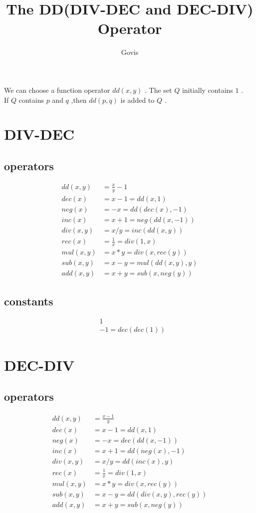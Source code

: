 \documentclass{article}
\title{The DD(DIV-DEC and DEC-DIV) Operator}
\author{Govis}
\begin{document}
\maketitle

\begin{center}
We can choose a function operator $ dd(x, y) $ . The set $ Q $ initially contains $ 1 $ . \\
If $ Q $ contains $ p $ and $ q $ ,then $ dd(p,q) $ is added to $ Q $ .
\end{center}

\section*{DIV-DEC}

\subsection*{operators}
\begin{align*}
dd(x, y) &= \frac{x}{y} - 1 \\
dec(x) &= x - 1 = dd(x, 1) \\
neg(x) &= -x = dd(dec(x), -1) \\
inc(x) &= x + 1 = neg(dd(x, -1)) \\
div(x, y) &= x / y = inc(dd(x, y)) \\
rec(x) &= \frac{1}{x} = div(1, x) \\
mul(x, y) &= x * y = div(x, rec(y)) \\
sub(x, y) &= x - y = mul(dd(x, y), y) \\
add(x, y) &= x + y = sub(x, neg(y))
\end{align*}


\subsection*{constants}
\begin{align*}
&1 \\
&-1 = dec(dec(1))
\end{align*}

\section*{DEC-DIV}

\subsection*{operators}
\begin{align*}
dd(x, y) &= \frac{x - 1}{y} \\
dec(x) &= x - 1 = dd(x, 1) \\
neg(x) &= -x = dec(dd(x, -1)) \\
inc(x) &= x + 1 = dd(neg(x), -1) \\
div(x, y) &= x / y = dd(inc(x), y) \\
rec(x) &= \frac{1}{x} = div(1, x) \\
mul(x, y) &= x * y = div(x, rec(y)) \\
sub(x, y) &= x - y = dd(div(x, y), rec(y)) \\
add(x, y) &= x + y = sub(x, neg(y))
\end{align*}
\end{document}
